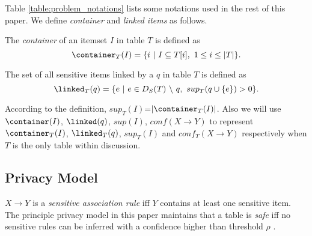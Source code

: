 Table \ref{table:problem_notations} lists some notations used in the
rest of this paper. We define {\em container} and {\em linked items}
as follows.

\begin{definition}[Container]
The \emph{container} of an itemset $I$ in table $T$ is defined as
\begin{equation}
\container_T(I) = \{ i ~|~ I \subseteq T[i],~ 1 \leq i \leq |T| \}
.
\end{equation}
\end{definition}

\begin{definition}
The set of all sensitive items linked by a \qid $q$ in table $T$ is defined as
\begin{equation}
\linked_T(q) = \{ e ~|~ e \in D_S(T) ~\backslash~ q,~ sup_{T}(q\cup\{e\}) > 0 \}.
\end{equation}
\end{definition}

According to the definition, $sup_{T}(I)$=$|\container_T(I)|$.
Also we will use $\container(I)$, $\linked(q)$, $sup(I)$,
$conf(X \rightarrow Y)$ to represent $\container_T(I)$,
$\linked_T(q)$, $sup_{T}(I)$ and $conf_{T}(X \rightarrow Y)$ respectively
when $T$ is the only table within discussion.

\subsection{Privacy Model}
$X \rightarrow Y$ is a {\em sensitive association rule} iff $Y$ contains
at least one sensitive item.
The principle privacy model in this paper
maintains that a table is {\em safe} iff no sensitive rules can be inferred
with a confidence higher than threshold $\rho$ \cite{Cao:2010:rho}.

